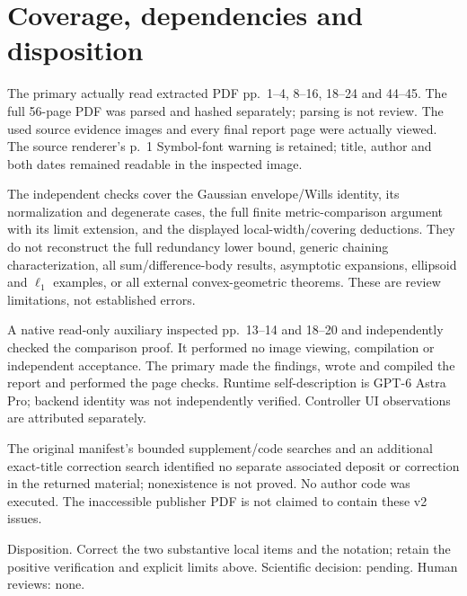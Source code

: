 \documentclass[10pt]{article}
\begin{document}
\section*{Coverage, dependencies and disposition}
The primary actually read extracted PDF pp. 1–4, 8–16, 18–24 and 44–45. The full 56-page PDF was parsed and hashed separately; parsing is not review. The used source evidence images and every final report page were actually viewed. The source renderer’s p. 1 Symbol-font warning is retained; title, author and both dates remained readable in the inspected image.\par
The independent checks cover the Gaussian envelope/Wills identity, its normalization and degenerate cases, the full finite metric-comparison argument with its limit extension, and the displayed local-width/covering deductions. They do not reconstruct the full redundancy lower bound, generic chaining characterization, all sum/difference-body results, asymptotic expansions, ellipsoid and \(\ell_1\) examples, or all external convex-geometric theorems. These are review limitations, not established errors.\par
A native read-only auxiliary inspected pp. 13–14 and 18–20 and independently checked the comparison proof. It performed no image viewing, compilation or independent acceptance. The primary made the findings, wrote and compiled the report and performed the page checks. Runtime self-description is GPT-6 Astra Pro; backend identity was not independently verified. Controller UI observations are attributed separately.\par
The original manifest’s bounded supplement/code searches and an additional exact-title correction search identified no separate associated deposit or correction in the returned material; nonexistence is not proved. No author code was executed. The inaccessible publisher PDF is not claimed to contain these v2 issues.\par
Disposition. Correct the two substantive local items and the notation; retain the positive verification and explicit limits above. Scientific decision: pending. Human reviews: none.\par
\end{document}

